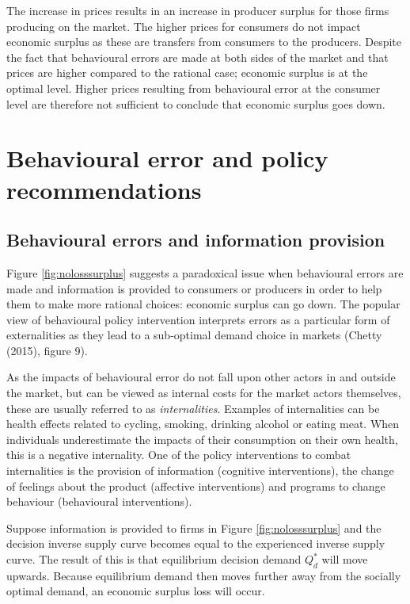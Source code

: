 \documentclass[
]{book}
\begin{document}
The increase in prices results in an increase in producer surplus for those firms producing on the market. The higher prices for consumers do not impact economic surplus as these are transfers from consumers to the producers. Despite the fact that behavioural errors are made at both sides of the market and that prices are higher compared to the rational case; economic surplus is at the optimal level. Higher prices resulting from behavioural error at the consumer level are therefore not sufficient to conclude that economic surplus goes down.

\hypertarget{behavioural-error-and-policy-recommendations}{%
\section{Behavioural error and policy recommendations}\label{behavioural-error-and-policy-recommendations}}

\hypertarget{behavioural-errors-and-information-provision}{%
\subsection{Behavioural errors and information provision}\label{behavioural-errors-and-information-provision}}

Figure \ref{fig:nolosssurplus} suggests a paradoxical issue when behavioural errors are made and information is provided to consumers or producers in order to help them to make more rational choices: economic surplus can go down. The popular view of behavioural policy intervention interprets errors as a particular form of externalities as they lead to a sub-optimal demand choice in markets (Chetty (2015), figure 9).

As the impacts of behavioural error do not fall upon other actors in and outside the market, but can be viewed as internal costs for the market actors themselves, these are usually referred to as \emph{internalities}. Examples of internalities can be health effects related to cycling, smoking, drinking alcohol or eating meat. When individuals underestimate the impacts of their consumption on their own health, this is a negative internality. One of the policy interventions to combat internalities is the provision of information (cognitive interventions), the change of feelings about the product (affective interventions) and programs to change behaviour (behavioural interventions).

Suppose information is provided to firms in Figure \ref{fig:nolosssurplus} and the decision inverse supply curve becomes equal to the experienced inverse supply curve. The result of this is that equilibrium decision demand \(Q_d^*\) will move upwards. Because equilibrium demand then moves further away from the socially optimal demand, an economic surplus loss will occur.
\end{document}

